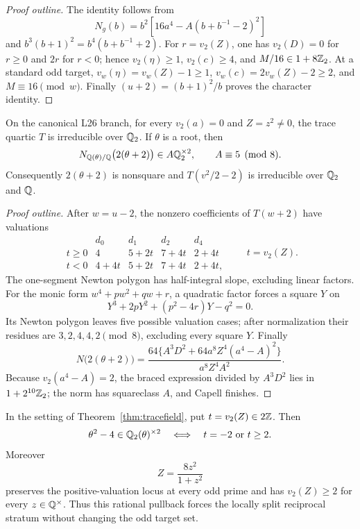 \begin{proof}[Proof outline]
The identity follows from
\[
 N_g(b)=b^2[16a^4-A(b+b^{-1}-2)^2]
\]
and \(b^3(b+1)^2=b^4(b+b^{-1}+2)\).
For \(r=v_2(Z)\), one has \(v_2(D)=0\) for \(r\ge0\) and \(2r\) for
\(r<0\); hence \(v_2(\eta)\ge1\), \(v_2(c)\ge4\), and
\(M/16\in1+8\mathbb{Z}_2\).  At a standard odd target,
\(v_w(\eta)=v_w(Z)-1\ge1\), \(v_w(c)=2v_w(Z)-2\ge2\), and
\(M\equiv16\pmod w\).  Finally
\((u+2)=(b+1)^2/b\) proves the character identity.
\end{proof}

\begin{theorem}
\label{thm:tracefield}
On the canonical L26 branch, for every \(v_2(a)=0\) and
\(Z=z^2\ne0\), the trace quartic \(T\) is irreducible over \(\mathbb{Q}_2\).
If \(\theta\) is a root, then
\[
 N_{\mathbb{Q}(\theta)/\mathbb{Q}}\bigl(2(\theta+2)\bigr)
 \in A\mathbb{Q}_2^{\times2},\qquad A\equiv5\pmod8.
\]
Consequently \(2(\theta+2)\) is nonsquare and
\(T(v^2/2-2)\) is irreducible over \(\mathbb{Q}_2\) and \(\mathbb{Q}\).
\end{theorem}

\begin{proof}[Proof outline]
After \(w=u-2\), the nonzero coefficients of \(T(w+2)\) have valuations
\[
\begin{array}{c|rrrr}
 &d_0&d_1&d_2&d_4\\ \hline
t\ge0&4&5+2t&7+4t&2+4t\\
t<0&4+4t&5+2t&7+4t&2+4t ,
\end{array}
\qquad t=v_2(Z).
\]
The one-segment Newton polygon has half-integral slope, excluding linear
factors.  For the monic form \(w^4+pw^2+qw+r\), a quadratic factor
forces a square \(Y\) on
\[
Y^3+2pY^2+(p^2-4r)Y-q^2=0.
\]
Its Newton polygon leaves five possible valuation cases; after
normalization their residues are \(3,2,4,4,2\pmod8\), excluding every
square \(Y\).  Finally
\[
N\bigl(2(\theta+2)\bigr)=
\frac{64\{A^3D^2+64a^8Z^4(a^4-A)^2\}}{a^8Z^4A^2}.
\]
Because \(v_2(a^4-A)=2\), the braced expression divided by \(A^3D^2\)
lies in \(1+2^{10}\mathbb{Z}_2\); the norm has squareclass \(A\), and Capell
finishes.
\end{proof}

\begin{theorem}
\label{thm:reciprocallift}
In the setting of Theorem~\ref{thm:tracefield}, put
\(t=v_2(Z)\in2\mathbb{Z}\).  Then
\[
 \theta^2-4\in\mathbb{Q}_2(\theta)^{\times2}
 \quad\Longleftrightarrow\quad t=-2\ \text{or}\ t\ge2.
\]
Moreover
\[
 Z=\frac{8z^2}{1+z^2}
\]
preserves the positive-valuation locus at every odd prime and has
\(v_2(Z)\ge2\) for every \(z\in\mathbb{Q}^\times\).  Thus this rational pullback
forces the locally split reciprocal stratum without changing the odd
target set.
\end{theorem}

